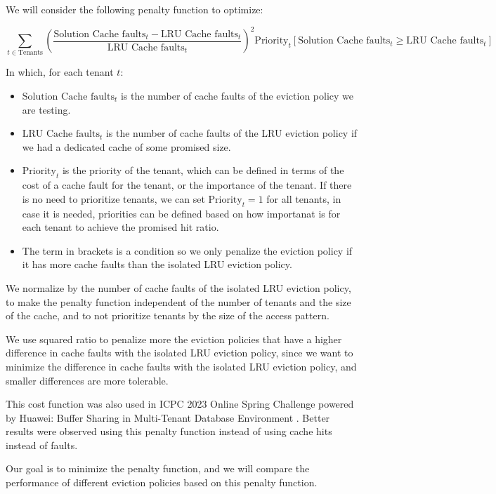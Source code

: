 We will consider the following penalty function to optimize:

$$
\sum_{t \in \text{Tenants}} \left( \frac{\text{Solution Cache faults}_t - \text{LRU Cache faults}_t}{\text{LRU Cache faults}_t} \right) ^2 \text{Priority}_t \left[\text{Solution Cache faults}_t \geq \text{LRU Cache faults}_t\right]
$$

In which, for each tenant $t$:
\begin{itemize}
    \item $\text{Solution Cache faults}_t$ is the number of cache faults of the eviction policy we are testing.
    \item $\text{LRU Cache faults}_t$ is the number of cache faults of the LRU eviction policy if we had a dedicated cache of some promised size.
    \item $\text{Priority}_t$ is the priority of the tenant, which can be defined in terms of the cost of a cache fault for the tenant, or the importance of the tenant. If there is no need to prioritize tenants, we can set $\text{Priority}_t = 1$ for all tenants, in case it is needed, priorities can be defined based on how importanat is for each tenant to achieve the promised hit ratio.
    \item The term in brackets is a condition so we only penalize the eviction policy if it has more cache faults than the isolated LRU eviction policy.
\end{itemize}

We normalize by the number of cache faults of the isolated LRU eviction policy, to make 
the penalty function independent of the number of tenants and the size of the cache, and to 
not prioritize tenants by the size of the access pattern.

We use squared ratio to penalize more the eviction policies that have a higher difference
in cache faults with the isolated LRU eviction policy, since we want to minimize the
difference in cache faults with the isolated LRU eviction policy, and smaller differences
are more tolerable.

This cost function was also used in ICPC 2023 Online Spring Challenge powered by Huawei: 
Buffer Sharing in Multi-Tenant Database Environment \cite{huawei-challenge}. Better results
were observed using this penalty function instead of using cache hits instead of faults.

Our goal is to minimize the penalty function, and we will compare the performance of
different eviction policies based on this penalty function.

